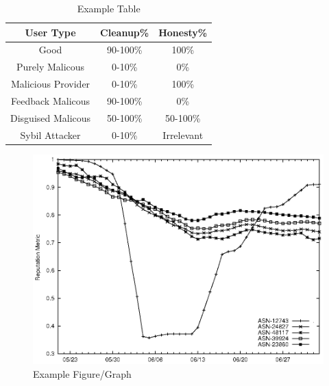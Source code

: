 \documentclass{sig-alternate}
\begin{document}
\begin{table}[htb!]
	\begin{center}
  \begin{tabular}{| c | c | c |}
    \hline
    \textbf{User Type} & \textbf{Cleanup\%} & \textbf{Honesty\%} \\ \hline
    Good & 90-100\% & 100\% \\ \hline
    Purely Malicous & 0-10\% & 0\% \\ \hline
		Malicious Provider & 0-10\% & 100\% \\ \hline
		Feedback Malicous & 90-100\% & 0\% \\ \hline
		Disguised Malicous & 50-100\% & 50-100\% \\ \hline
		Sybil Attacker & 0-10\% & Irrelevant \\ \hline
  \end{tabular}
	\caption{Example Table}
  \label{tab:some_table}
	\vspace{-10pt}
	\end{center}
\end{table}

\begin{figure}[htb!]
	\begin{center}
		\includegraphics[width=0.75\linewidth]{some_graph}
	\end{center}
	\vspace{-12pt}
	\caption{Example Figure/Graph}
	\label{fig:some_graph}
\end{figure}
\end{document}
